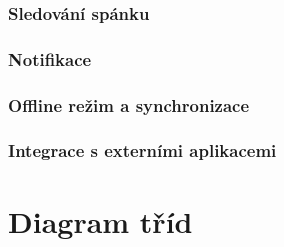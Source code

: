 \subsubsection{Sledování spánku}

\subsubsection{Notifikace}

\subsubsection{Offline režim a synchronizace}

\subsubsection{Integrace s externími aplikacemi}

\section{Diagram tříd}



